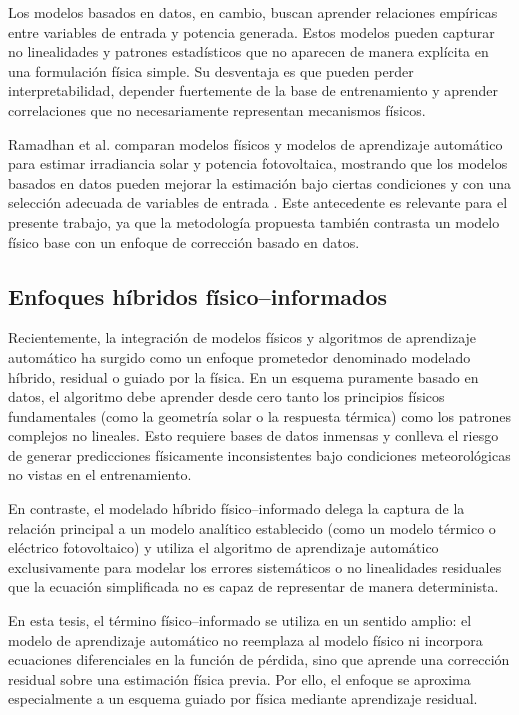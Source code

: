 \documentclass[12pt, letterpaper]{article}
\begin{document}
Los modelos basados en datos, en cambio, buscan aprender relaciones emp\'iricas entre variables de entrada y potencia generada. Estos modelos pueden capturar no linealidades y patrones estad\'isticos que no aparecen de manera expl\'icita en una formulaci\'on f\'isica simple. Su desventaja es que pueden perder interpretabilidad, depender fuertemente de la base de entrenamiento y aprender correlaciones que no necesariamente representan mecanismos f\'isicos.

Ramadhan et al. comparan modelos físicos y modelos de aprendizaje automático para estimar irradiancia solar y potencia fotovoltaica, mostrando que los modelos basados en datos pueden mejorar la estimación bajo ciertas condiciones y con una selección adecuada de variables de entrada \cite{ramadhan2021}. Este antecedente es relevante para el presente trabajo, ya que la metodología propuesta también contrasta un modelo físico base con un enfoque de corrección basado en datos.
\subsection{Enfoques híbridos físico--informados}

Recientemente, la integración de modelos físicos y algoritmos de aprendizaje automático ha surgido como un enfoque prometedor denominado modelado híbrido, residual o guiado por la física. En un esquema puramente basado en datos, el algoritmo debe aprender desde cero tanto los principios físicos fundamentales (como la geometría solar o la respuesta térmica) como los patrones complejos no lineales. Esto requiere bases de datos inmensas y conlleva el riesgo de generar predicciones físicamente inconsistentes bajo condiciones meteorológicas no vistas en el entrenamiento.

En contraste, el modelado híbrido físico--informado delega la captura de la relación principal a un modelo analítico establecido (como un modelo térmico o eléctrico fotovoltaico) y utiliza el algoritmo de aprendizaje automático exclusivamente para modelar los errores sistemáticos o no linealidades residuales que la ecuación simplificada no es capaz de representar de manera determinista.

En esta tesis, el t\'ermino f\'isico--informado se utiliza en un sentido amplio: el modelo de aprendizaje autom\'atico no reemplaza al modelo f\'isico ni incorpora ecuaciones diferenciales en la funci\'on de p\'erdida, sino que aprende una correcci\'on residual sobre una estimaci\'on f\'isica previa. Por ello, el enfoque se aproxima especialmente a un esquema guiado por f\'isica mediante aprendizaje residual.
\end{document}
